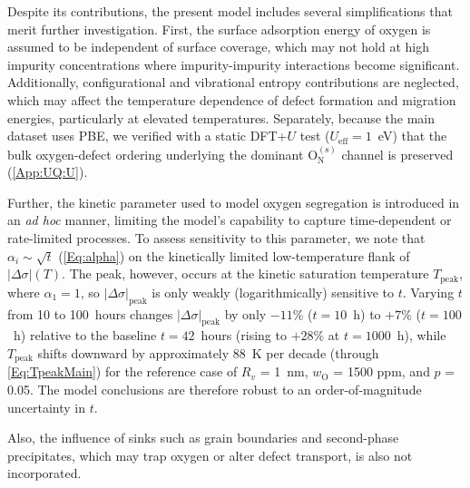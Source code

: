 \documentclass[preprint,12pt,sort&compress]{elsarticle}
\newcommand{\?}{\stackrel{?}{=}}
\begin{document}
Despite its contributions, the present model includes several simplifications that merit further investigation. First, the surface adsorption energy of oxygen is assumed to be independent of surface coverage, which may not hold at high impurity concentrations where impurity-impurity interactions become significant. Additionally, configurational and vibrational entropy contributions are neglected, which may affect the temperature dependence of defect formation and migration energies, particularly at elevated temperatures. Separately, because the main dataset uses PBE, we verified with a static DFT+$U$ test ($U_\text{eff}=1$~eV) that the bulk oxygen-defect ordering underlying the dominant $\text{O}_\text{N}^{(\text{s})}$ channel is preserved (\ref{App:UQ:U}).

Further, the kinetic parameter used to model oxygen segregation is introduced in an \textit{ad hoc} manner, limiting the model's capability to capture time-dependent or rate-limited processes. To assess sensitivity to this parameter, we note that $\alpha_i \sim \sqrt{t}$ (\cref{Eq:alpha}) on the kinetically limited low-temperature flank of $|\Delta \sigma|(T)$. The peak, however, occurs at the kinetic saturation temperature $T_\text{peak}$, where $\alpha_1 = 1$, so $|\Delta \sigma|_\text{peak}$ is only weakly (logarithmically) sensitive to $t$. Varying $t$ from 10 to 100~hours changes $|\Delta \sigma|_\text{peak}$ by only $-11$\% ($t = 10$~h) to $+7$\% ($t = 100$~h) relative to the baseline $t = 42$~hours (rising to $+28$\% at $t = 1000$~h), while $T_\text{peak}$ shifts downward by approximately 88~K per decade (through \cref{Eq:TpeakMain}) for the reference case of $R_v$ = 1~nm, $w_\text{O}$ = 1500 ppm, and $p$ = 0.05. The model conclusions are therefore robust to an order-of-magnitude uncertainty in $t$.

Also, the influence of sinks such as grain boundaries and second-phase precipitates, which may trap oxygen or alter defect transport, is also not incorporated.
\end{document}
